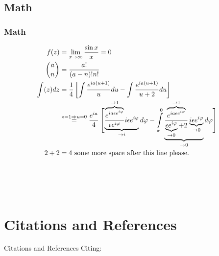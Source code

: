 \subsection{Math}




\begin{frame}
	\frametitle{Math}
	\begin{align}
			 f(z) &= 
			 	\lim\limits_{x\rightarrow \infty} \frac{\sin x}{x} = 0\\
		 	 \binom{a}{n} &= 
		 	 	\frac{a!}{(a-n)! n!}\\
		 	 \nonumber \int(z) dz &=  
		 	 	\frac14 \left[ \int\frac{e^{ia(u + 1)}}{u} du - \int\frac{e^{ia(u + 1)}}{u + 2}du   \right]\\[1em]
		 	 & \overset{z = 1 \Rightarrow u = 0}=  
		 	 	\frac{e^{i a}}{4} \left[\vphantom{ \int\limits_{\pi}^0} \smash{ \underbrace{\frac{\overbrace{e^{ia \epsilon e^{i \varphi}}}^{\rightarrow 1}} {\epsilon e^{i \varphi}} i \epsilon e^{i \varphi}}_{\rightarrow i}  d \varphi            - \int\limits_{\pi}^0 \underbrace{\frac{\overbrace{e^{ia \epsilon e^{i \varphi}}}^{\rightarrow 1}} {\underbrace{\epsilon e^{i \varphi}}_{\rightarrow 0} + 2} \underbrace{i \epsilon e^{i \varphi}}_{\rightarrow 0}}_{\rightarrow 0}  d \varphi  }\right]\\[2em]
		 	 2 + 2 &= 4 \ \text{some more space after this line please.}\\[4em]\nonumber
	\end{align}
\end{frame}













\section{Citations and References}


\begin{frame}{Citations and References}
    Citing: \cite{AHF}
    
    \renewcommand*{\bibfont}{\footnotesize}
    
\end{frame}







